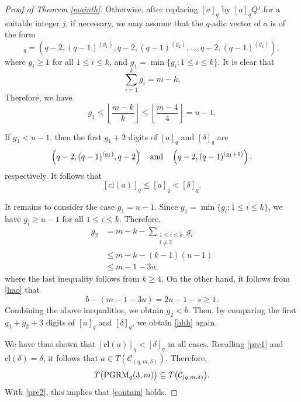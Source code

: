 \documentclass[journal,onecolumn]{IEEEtran}
\begin{document}
\begin{proof}[Proof of Theorem \ref{mainth}]
Otherwise, after replacing $[a]_q$ by $[a]_qQ^j$ for a suitable integer
$j$, if necessary, we may assume that the $q$-adic vector of $a$ is of the form
\begin{equation*}
    [a]_q = \left( q-2, (q-1)^{(g_1)}, q-2, (q-1)^{(g_2)}, \dots, q-2, (q-1)^{(g_k)} \right),
\end{equation*}
where $g_i \ge 1$ for all $1 \le i \le k$, and $g_1 = \min \{g_i : 1 \le i \le k\}$. It is clear that
\begin{equation*}
    \sum_{i=1}^k g_i = m - k.
\end{equation*}
Therefore, we have
\begin{equation*}
    g_1  \le \left\lfloor \frac{m-k}{k} \right\rfloor \le \left\lfloor \frac{m-4}{4} \right\rfloor = u - 1.
\end{equation*}

If $g_1<u-1$, then the first $g_1+2$ digits of $[a]_q$ and 
$[\delta]_q$ are 
\begin{equation*}
    \left(q-2,(q-1)^{(g_1)},q-2\right)\quad \hbox{and}\quad 
\left(q-2,(q-1)^{(g_1+1)}\right),
\end{equation*}
respectively. It follows that
\begin{equation} \label{hhh}  
[\mathrm{cl}(a)]_q \le [a]_q < [\delta]_q.
\end{equation}

It remains to consider the case $g_1=u-1$. Since $g_1 = \min \{g_i : 1 \le i \le k\}$, we have $g_i \ge u - 1$ for all $1 \le i \le k$. Therefore,
\begin{align*}
    g_2 &= m - k - \sum_{\substack{1\leq i\leq k\\ i\neq2}}g_i\\
       & \le m - k - (k-1)(u-1) \\
       &\le m - 1 - 3u,
\end{align*}
where the last inequality follows from $k \ge 4$. On the other hand, it follows from \eqref{hao} that
\begin{equation}\label{inequality}
    b - (m - 1 - 3u) = 2u - 1 - s \ge 1.
\end{equation}
Combining the above inequalities, we obtain $g_2 < b$. Then, by comparing the first $g_1 + g_2 + 3$ digits of $[a]_q$ and $[\delta]_q$, we obtain \eqref{hhh} again.


We have thus shown that $[\mathrm{cl}(a)]_q < [\delta]_q$ in all cases. Recalling \eqref{pre1} and $\mathrm{cl}(\delta) = \delta$, it follows that $a \in T(\mathcal{C}_{(q,m,\delta)})$. Therefore,
\begin{equation}\notag
T\bigl(\mathrm{PGRM}_q(3,m)\bigr)
\subseteq
T\bigl(\mathcal{C}_{(q,m,\delta)}\bigr).
\end{equation}
With \eqref{pre2}, this implies that \eqref{contain} holds.


\end{proof}
\end{document}
